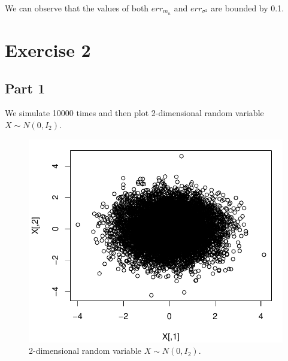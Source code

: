\documentclass[12pt, a4paper]{article}\usepackage[]{graphicx}\usepackage[]{color}
\makeatletter
\def\maxwidth{ %
  \ifdim\Gin@nat@width>\linewidth
    \linewidth
  \else
    \Gin@nat@width
  \fi
}
\newenvironment{knitrout}{}{} %
\makeatother
\begin{document}
We can observe that the values of both $err_{m_n}$ and $err_{\sigma^2}$ are bounded by 0.1.


\section{Exercise 2}

\subsection{Part 1}
We simulate 10000 times and then plot 2-dimensional random variable $X\sim N(0,I_2)$.
\begin{knitrout}
\color{fgcolor}\begin{figure}[H]

{\centering \includegraphics[width=\maxwidth]{figure/ex2X-1} 

}

\caption[2-dimensional random variable $X \sim N(0,I_2)$]{2-dimensional random variable $X \sim N(0,I_2)$.}\label{fig:ex2X}
\end{figure}


\end{knitrout}
\end{document}
